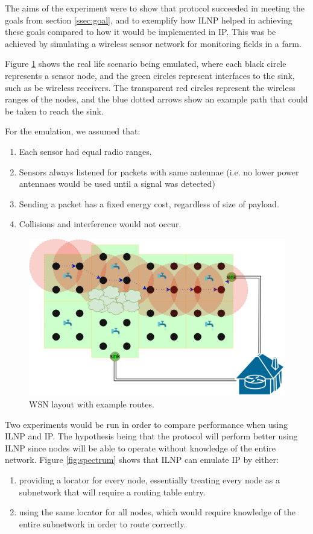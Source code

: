 \documentclass[12pt]{article}
\begin{document}
The aims of the experiment were to show that protocol succeeded in meeting the goals from section \ref{ssec:goal}, and to exemplify how ILNP helped in achieving these goals compared to how it would be implemented in IP. This was be achieved by simulating a wireless sensor network for monitoring fields in a farm. 

Figure \ref{fig:layout} shows the real life scenario being emulated, where each black circle represents a sensor node, and the green circles represent interfaces to the sink, such as be wireless receivers. The transparent red circles represent the wireless ranges of the nodes, and the blue dotted arrows show  an example path that could be taken to reach the sink.

For the emulation, we assumed that: 
\begin{enumerate}
    \item Each sensor had equal radio ranges.
    \item Sensors always listened for packets with same antennae (i.e. no lower power antennaes would be used until a signal was detected\cite{offon})
    \item Sending a packet has a fixed energy cost, regardless of size of payload.
    \item Collisions and interference would not occur.
\end{enumerate}

\begin{figure}[!ht]
	\centering
	\includegraphics[width=\linewidth]{images/layout}
	\caption{WSN layout with example routes.}
	\label{fig:layout}
\end{figure}

Two experiments would be run in order to compare performance when using ILNP and IP. The hypothesis being that the protocol will perform better using ILNP since nodes will be able to operate without knowledge of the entire network. Figure \ref{fig:spectrum} shows that ILNP can emulate IP by either:
\begin{enumerate}
	\item providing a locator for every node, essentially treating every node as a subnetwork that will require a routing table entry.
	\item using the same locator for all nodes, which would require knowledge of the entire subnetwork in order to route correctly.
\end{enumerate}
\end{document}
